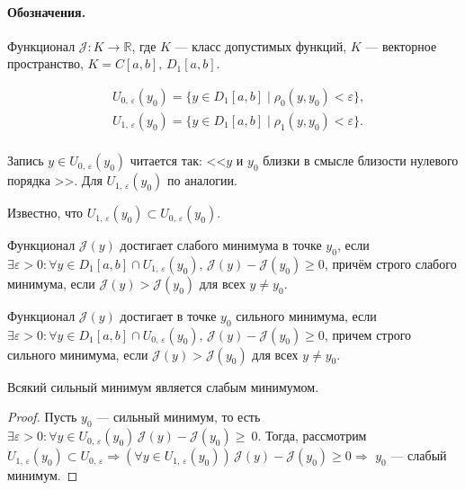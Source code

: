
\paragraph{Обозначения. } Функционал $ \mathcal{J}: K \to \mathbb{R} $, где $ K $ --- класс допустимых функций, $ K $ --- векторное пространство, $ K = C[a, b], \, D_1[a, b]$.

\begin{align*}
	&U_{0, \, \varepsilon}(y_0) = \{ y \in D_1[a, b] \mid \rho_0(y, y_0) < \varepsilon \}, \\
	&U_{1, \, \varepsilon}(y_0) = \{ y \in D_1[a, b] \mid \rho_1(y, y_0) < \varepsilon \}. \\
\end{align*}

Запись $ y \in U_{0, \, \varepsilon}(y_0) $ читается так: <<$ y $ и $ y_0 $ близки в смысле близости нулевого порядка >>. Для $  U_{1, \, \varepsilon}(y_0) $ по аналогии.

Известно, что $ U_{1, \, \varepsilon}(y_0) \subset  U_{0, \, \varepsilon}(y_0)$.

\begin{definition}
	Функционал $\mathcal{J}(y)$ достигает слабого минимума в точке $ y_0 $, если $ \exists \varepsilon > 0: \forall y \in D_1[a, b] \cap U_{1, \, \varepsilon}(y_0), \, \mathcal{J}(y) - \mathcal{J}(y_0) \geqslant 0$, причём строго слабого минимума, если $ \mathcal{J}(y) > \mathcal{J}(y_0) $ для всех $ y \not = y_0$.
\end{definition}

\begin{definition}
	Функционал $ \mathcal{J}(y) $ достигает в точке $ y_0 $ сильного минимума, если $ \exists \varepsilon > 0: \forall y \in D_1[a, b] \cap U_{0, \, \varepsilon}(y_0), \, \mathcal{J}(y) - \mathcal{J}(y_0) \geqslant 0 $, причем строго сильного минимума, если $ \mathcal{J}(y) > \mathcal{J}(y_0) $ для всех $ y \not = y_0$.
\end{definition}

\begin{utv}
	Всякий сильный минимум является слабым минимумом.
\end{utv}
\begin{proof}
	Пусть $ y_0 $ --- сильный минимум, то есть $ \exists \varepsilon > 0: \forall y \in U_{0, \, \varepsilon}(y_0) \, \mathcal{J}(y) - \mathcal{J}(y_0) \geqslant~0$.
	Тогда, рассмотрим $ U_{1, \, \varepsilon}(y_0) \subset U_{0, \, \varepsilon} \Rightarrow (
	\forall y \in U_{1, \, \varepsilon}(y_0)) \, \mathcal{J}(y) - \mathcal{J}(y_0) \geqslant 0 \Rightarrow $ $ y_0 $ --- слабый минимум.  
\end{proof}

